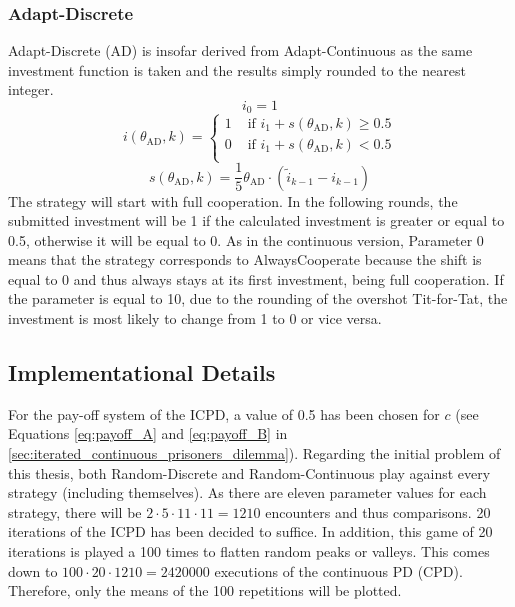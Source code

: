 \documentclass[11pt]{article}
\begin{document}
\subsubsection*{Adapt-Discrete}
Adapt-Discrete (AD) is insofar derived from Adapt-Continuous as the same investment function is taken and the results simply rounded to the nearest integer.
\begin{equation}
	i_0 = 1
	\label{eq:AD_i0}
\end{equation}
\begin{equation}
	i(\theta_{\mathrm{AD}}, k) =
	\begin{cases}
		1 & \text{ if } i_1 + s(\theta_{\mathrm{AD}}, k) \ge 0.5\\
		0 & \text{ if } i_1 + s(\theta_{\mathrm{AD}}, k) < 0.5\\
	\end{cases}
	\label{eq:AD_i_eq}
\end{equation}
\begin{equation}
	s(\theta_{\mathrm{AD}}, k) = \frac{1}{5} \theta_{\mathrm{AD}} \cdot (\tilde{i}_{k-1} - i_{k-1})
	\label{eq:AD_s_eq}
\end{equation}
The strategy will start with full cooperation.
In the following rounds, the submitted investment will be 1 if the calculated investment is greater or equal to 0.5, otherwise it will be equal to 0.
As in the continuous version, Parameter 0 means that the strategy corresponds to AlwaysCooperate because the shift is equal to 0 and thus always stays at its first investment, being full cooperation.
If the parameter is equal to 10, due to the rounding of the overshot Tit-for-Tat, the investment is most likely to change from 1 to 0 or vice versa.

\subsection{Implementational Details} \label{sec:implementational_details}

For the pay-off system of the ICPD, a value of 0.5 has been chosen for $c$ (see Equations \ref{eq:payoff_A} and \ref{eq:payoff_B} in \ref{sec:iterated_continuous_prisoners_dilemma}).
Regarding the initial problem of this thesis, both Random-Discrete and Random-Continuous play against every strategy (including themselves).
As there are eleven parameter values for each strategy, there will be $2 \cdot 5 \cdot 11 \cdot 11 = 1210$ encounters and thus comparisons.
20 iterations of the ICPD has been decided to suffice.
In addition, this game of 20 iterations is played a 100 times to flatten random peaks or valleys.
This comes down to $100 \cdot 20 \cdot 1210 = 2420000$ executions of the continuous PD (CPD).
Therefore, only the means of the 100 repetitions will be plotted.
\end{document}
